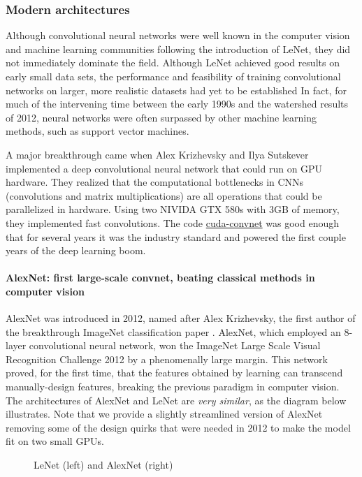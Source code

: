 \subsubsection{Modern architectures}

Although convolutional neural networks were well known in the computer vision and machine learning communities following the introduction of LeNet, they did not immediately dominate the field. Although LeNet achieved good results on early small data sets, the performance and feasibility of training convolutional networks on larger, more realistic datasets had yet to be established
In fact, for much of the intervening time between the early 1990s and the watershed results of 2012, neural networks were often surpassed by other machine learning methods, such as support vector machines.

A major breakthrough came when Alex Krizhevsky and Ilya Sutskever implemented a deep convolutional neural network that could run on GPU hardware. They realized that the computational bottlenecks in CNNs (convolutions and matrix multiplications) are all operations that could be parallelized in hardware. Using two NIVIDA GTX 580s with 3GB of memory, they implemented fast convolutions. The code \href{https://code.google.com/archive/p/cuda-convnet/}{cuda-convnet} was good enough that for several years it was the industry standard and powered the first couple years of the deep learning boom.

\paragraph{AlexNet: first large-scale convnet, beating classical methods in computer vision}


AlexNet was introduced in 2012, named after Alex Krizhevsky, the first author of the breakthrough ImageNet classification paper \citep{Krizhevsky2012}. AlexNet, which employed an 8-layer convolutional neural network, won the ImageNet Large Scale Visual Recognition Challenge 2012 by a phenomenally large margin. This network proved, for the first time, that the features obtained by learning can transcend manually-design features, breaking the previous paradigm in computer vision. The architectures of AlexNet and LeNet are \textit{very similar}, as the diagram below illustrates. Note that we provide a slightly streamlined version of AlexNet removing some of the design quirks that were needed in 2012 to make the model fit on two small GPUs.

\begin{figure}[hpt]
	\centering
	
	\caption{LeNet (left) and AlexNet (right)}
	\label{fig:alexnet}
\end{figure}

